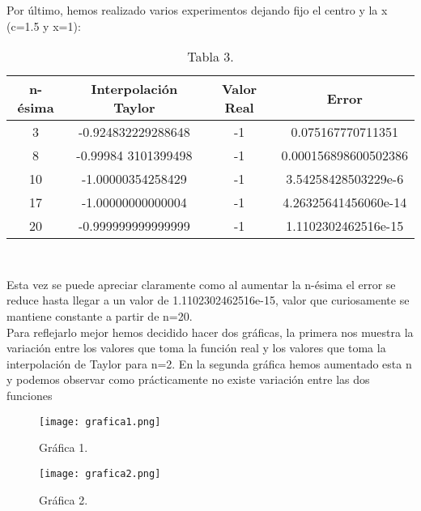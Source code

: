 \documentclass[spanish,a4paper,11pt,twoside]{report}
\begin{document}
Por último, hemos realizado varios experimentos dejando fijo el centro y la x (c=1.5 y x=1):\\
	\begin{table}[h]
	\begin{center}
	\begin{tabular}{||c|c|c|c||}
	\hline
    \hline
	n-ésima & Interpolación Taylor & Valor Real & Error \\
    \hline
	3 & -0.924832229288648 & -1 & 0.075167770711351\\
	\hline
    8 & -0.99984
    3101399498 & -1 & 0.000156898600502386\\
    \hline
    10 & -1.00000354258429 & -1 & 3.54258428503229e-6 \\
    \hline
    17 & -1.00000000000004 & -1 & 4.26325641456060e-14\\
	\hline
	20 & -0.999999999999999 & -1 & 1.1102302462516e-15\\	
	\hline
    \hline
	\end{tabular}
	\end{center}
    \caption{Tabla 3.}
    \label{Tabla 3}
    \end{table}
\begin{verbatim}


\end{verbatim}

	Esta vez se puede apreciar claramente como al aumentar la n-ésima el error se reduce hasta llegar a un valor de 1.1102302462516e-15, valor que curiosamente se mantiene constante a partir de n=20.\\
Para reflejarlo mejor hemos decidido hacer dos gráficas, la primera nos muestra la variación entre los valores que toma la función real y los valores que toma la interpolación de Taylor para n=2. En la segunda gráfica hemos aumentado esta n y podemos observar como prácticamente no existe variación entre las dos funciones

\begin{figure}
\begin{center}
\texttt{[image: grafica1.png]}
\caption{Gráfica 1.}
\label{Grafica1}
\end{center}
\end{figure}

\begin{figure}
\begin{center}
\texttt{[image: grafica2.png]}\label{Grafica2}
\caption{Gráfica 2.}
\end{center}
\end{figure}
%
\end{document}
